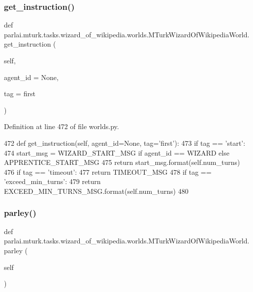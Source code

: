 \subsubsection{\texorpdfstring{get\+\_\+instruction()}{get\_instruction()}}
{\footnotesize\ttfamily def parlai.\+mturk.\+tasks.\+wizard\+\_\+of\+\_\+wikipedia.\+worlds.\+M\+Turk\+Wizard\+Of\+Wikipedia\+World.\+get\+\_\+instruction (\begin{DoxyParamCaption}\item[{}]{self,  }\item[{}]{agent\+\_\+id = {\ttfamily None},  }\item[{}]{tag = {\ttfamily \textquotesingle{}first\textquotesingle{}} }\end{DoxyParamCaption})}



Definition at line 472 of file worlds.\+py.


\begin{DoxyCode}
472     \textcolor{keyword}{def }get\_instruction(self, agent\_id=None, tag='first'):
473         \textcolor{keywordflow}{if} tag == \textcolor{stringliteral}{'start'}:
474             start\_msg = WIZARD\_START\_MSG \textcolor{keywordflow}{if} agent\_id == WIZARD \textcolor{keywordflow}{else} APPRENTICE\_START\_MSG
475             \textcolor{keywordflow}{return} start\_msg.format(self.num\_turns)
476         \textcolor{keywordflow}{if} tag == \textcolor{stringliteral}{'timeout'}:
477             \textcolor{keywordflow}{return} TIMEOUT\_MSG
478         \textcolor{keywordflow}{if} tag == \textcolor{stringliteral}{'exceed\_min\_turns'}:
479             \textcolor{keywordflow}{return} EXCEED\_MIN\_TURNS\_MSG.format(self.num\_turns)
480 
\end{DoxyCode}
\mbox{\label{classparlai_1_1mturk_1_1tasks_1_1wizard__of__wikipedia_1_1worlds_1_1MTurkWizardOfWikipediaWorld_a3b3cf41071bac1da0053627118f61d58}} 
\subsubsection{\texorpdfstring{parley()}{parley()}}
{\footnotesize\ttfamily def parlai.\+mturk.\+tasks.\+wizard\+\_\+of\+\_\+wikipedia.\+worlds.\+M\+Turk\+Wizard\+Of\+Wikipedia\+World.\+parley (\begin{DoxyParamCaption}\item[{}]{self }\end{DoxyParamCaption})}


